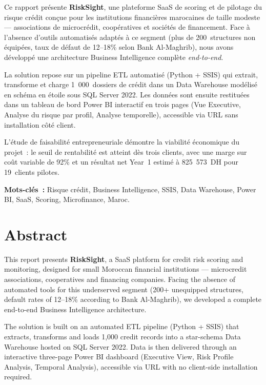 \documentclass[12pt, a4paper]{report}
\begin{document}
Ce rapport présente \textbf{RiskSight}, une plateforme SaaS de scoring
et de pilotage du risque crédit conçue pour les institutions financières
marocaines de taille modeste --- associations de microcrédit, coopératives
et sociétés de financement. Face à l'absence d'outils automatisés adaptés
à ce segment (plus de 200~structures non équipées, taux de défaut de
12--18\% selon Bank Al-Maghrib), nous avons développé une architecture
Business Intelligence complète \textit{end-to-end}.

La solution repose sur un pipeline ETL automatisé (Python + SSIS) qui
extrait, transforme et charge 1~000~dossiers de crédit dans un Data
Warehouse modélisé en schéma en étoile sous SQL Server 2022. Les données
sont ensuite restituées dans un tableau de bord Power BI interactif en
trois pages (Vue Executive, Analyse du risque par profil, Analyse
temporelle), accessible via URL sans installation côté client.

L'étude de faisabilité entrepreneuriale démontre la viabilité économique
du projet~: le seuil de rentabilité est atteint dès trois clients, avec
une marge sur coût variable de 92\% et un résultat net Year~1 estimé à 825~573~DH
 pour 19~clients pilotes.
\vspace{8cm}

\textbf{Mots-clés~:} Risque crédit, Business Intelligence, SSIS,
Data Warehouse, Power BI, SaaS, Scoring, Microfinance, Maroc.










\chapter*{Abstract}

This report presents \textbf{RiskSight}, a SaaS platform for credit risk
scoring and monitoring, designed for small Moroccan financial institutions
--- microcredit associations, cooperatives and financing companies. Facing
the absence of automated tools for this underserved segment (200+ unequipped
structures, default rates of 12--18\% according to Bank Al-Maghrib), we
developed a complete end-to-end Business Intelligence architecture.

The solution is built on an automated ETL pipeline (Python + SSIS) that
extracts, transforms and loads 1,000 credit records into a star-schema Data
Warehouse hosted on SQL Server 2022. Data is then delivered through an
interactive three-page Power BI dashboard (Executive View, Risk Profile
Analysis, Temporal Analysis), accessible via URL with no client-side
installation required.
\end{document}
